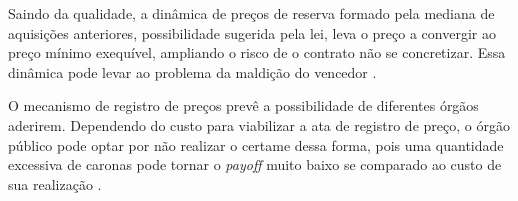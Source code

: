 Saindo da qualidade, a dinâmica de preços de reserva formado pela mediana de aquisições anteriores, possibilidade sugerida pela lei, leva o preço a convergir ao preço mínimo exequível, ampliando o risco de o contrato não se concretizar. Essa dinâmica pode levar ao problema da maldição do vencedor \citet{Signor2022}.

O mecanismo de registro de preços prevê a possibilidade de diferentes órgãos aderirem. Dependendo do custo para viabilizar a ata de registro de preço, o órgão público pode optar por não realizar o certame dessa forma, pois uma quantidade excessiva de caronas pode tornar o \emph{payoff} muito baixo se comparado ao custo de sua realização \citet{barbosa2013}.